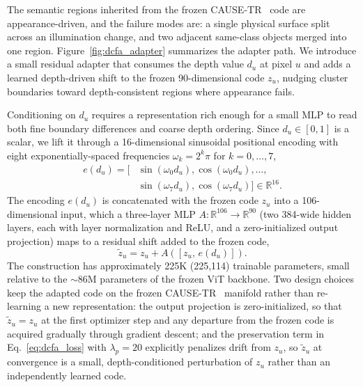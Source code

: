\documentclass{article}
\begin{document}
The semantic regions inherited from the frozen CAUSE-TR~\cite{kim2024cause} code are appearance-driven, and the failure modes are: a single physical surface split across an illumination change, and two adjacent same-class objects merged into one region. Figure~\ref{fig:dcfa_adapter} summarizes the adapter path. We introduce a small residual adapter that consumes the depth value $d_u$ at pixel $u$ and adds a learned depth-driven shift to the frozen 90-dimensional code $z_u$, nudging cluster boundaries toward depth-consistent regions where appearance fails.

Conditioning on $d_u$ requires a representation rich enough for a small MLP to read both fine boundary differences and coarse depth ordering. Since $d_u \in [0, 1]$ is a scalar, we lift it through a 16-dimensional sinusoidal positional encoding with eight exponentially-spaced frequencies $\omega_k = 2^k \pi$ for $k = 0, \dots, 7$,
\begin{equation}
\begin{aligned}
e(d_u) = \big[ &\sin(\omega_0 d_u), \cos(\omega_0 d_u), \dots, \\
              &\sin(\omega_7 d_u), \cos(\omega_7 d_u) \big] \in \mathbb{R}^{16}.
\end{aligned}
\label{eq:sinusoid}
\end{equation}
The encoding $e(d_u)$ is concatenated with the frozen code $z_u$ into a 106-dimensional input, which a three-layer MLP $A: \mathbb{R}^{106} \to \mathbb{R}^{90}$ (two 384-wide hidden layers, each with layer normalization and ReLU, and a zero-initialized output projection) maps to a residual shift added to the frozen code,
\begin{equation}
\tilde z_u = z_u + A([z_u,\, e(d_u)]).
\label{eq:residual}
\end{equation}
The construction has approximately 225K (225,114) trainable parameters, small relative to the $\sim$86M parameters of the frozen ViT backbone. Two design choices keep the adapted code on the frozen CAUSE-TR~\cite{kim2024cause} manifold rather than re-learning a new representation: the output projection is zero-initialized, so that $\tilde z_u = z_u$ at the first optimizer step and any departure from the frozen code is acquired gradually through gradient descent; and the preservation term in Eq.~\ref{eq:dcfa_loss} with $\lambda_p = 20$ explicitly penalizes drift from $z_u$, so $\tilde z_u$ at convergence is a small, depth-conditioned perturbation of $z_u$ rather than an independently learned code.
\end{document}
